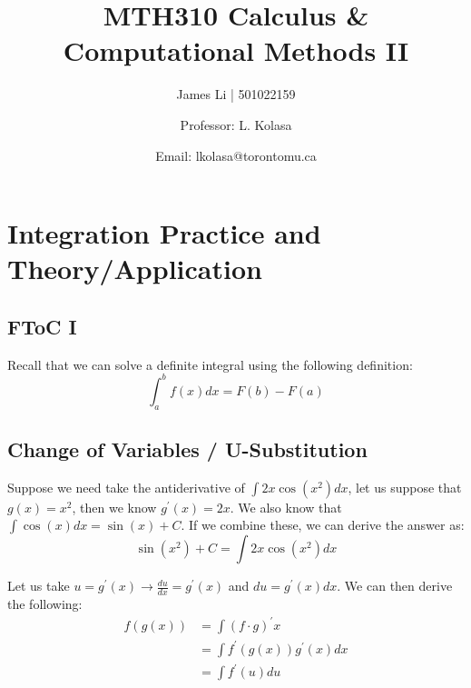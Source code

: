 \documentclass[a4paper]{article}
\title{MTH310 Calculus \& Computational Methods II}
\author{James Li | 501022159 \and Professor: L. Kolasa\and Email: lkolasa@torontomu.ca}
\date{}
\begin{document}
  \maketitle
  \tableofcontents
  \newpage
  \section{Integration Practice and Theory/Application} 
  \subsection{FToC I} 
  Recall that we can solve a definite integral using the following definition:
  $$
    \displaystyle\int_{a }^{b} f(x)dx = F(b) - F(a)
  $$ 
  \subsection{Change of Variables / U-Substitution}
  Suppose we need take the antiderivative of $\int 2x \cos(x^2)dx$, let us suppose that $g(x) = x^2$, then we know $g^\prime (x) = 2x$. We also know that $\int \cos (x) dx = \sin(x) + C$. If we combine these, we can derive the answer as:
  $$
  \sin (x^2) + C = \int 2x \cos(x^2)dx
  $$
  \begin{theorem}
    Let us take $u = g^\prime (x) \rightarrow \frac{du }{dx } = g^\prime (x)$ and $du = g^\prime (x) dx$. We can then derive the following:
      \begin{equation}
        \label{Usub}
        \begin{split}
          f(g(x)) &= \int (f \cdot g)^\prime x \\
                  &= \int f^\prime (g(x)) g^\prime(x) dx \\
                  &= \int f^\prime (u) du
        \end{split}
      \end{equation}
  \end{theorem}
\end{document}
